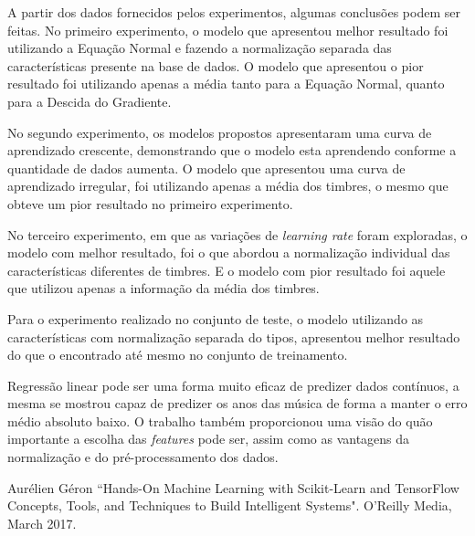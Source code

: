 \documentclass[conference]{IEEEtran}
\begin{document}
A partir dos dados fornecidos pelos experimentos, algumas conclusões podem ser feitas. No primeiro experimento, o modelo que apresentou melhor resultado foi utilizando a Equação Normal e fazendo a normalização separada das características presente na base de dados. O modelo que apresentou o pior resultado foi utilizando apenas a média tanto para a Equação Normal, quanto para a Descida do Gradiente.

No segundo experimento, os modelos propostos apresentaram uma curva de aprendizado crescente, demonstrando que o modelo esta aprendendo conforme a quantidade de dados aumenta. O modelo que apresentou uma curva de aprendizado irregular, foi utilizando apenas a média dos timbres, o mesmo que obteve um pior resultado no primeiro experimento.

No terceiro experimento, em que as variações de \textit{learning rate} foram exploradas, o modelo com melhor resultado, foi o que abordou a normalização individual das características diferentes de timbres. E o modelo com pior resultado foi aquele que utilizou apenas a informação da média dos timbres.

Para o experimento realizado no conjunto de teste, o modelo utilizando as características com normalização separada do tipos, apresentou melhor resultado do que o encontrado até mesmo no conjunto de treinamento. 

Regressão linear pode ser uma forma muito eficaz de predizer dados contínuos, a mesma se mostrou capaz de predizer os anos das música de forma a manter o erro médio absoluto baixo. O trabalho também proporcionou uma visão do quão importante a escolha das \emph{features} pode ser, assim como as vantagens da normalização e do pré-processamento dos dados.


\begin{thebibliography}{00}
 Aurélien Géron ``Hands-On Machine Learning with Scikit-Learn and TensorFlow
Concepts, Tools, and Techniques to Build Intelligent Systems". O'Reilly Media, March 2017.
\end{thebibliography}
\end{document}
